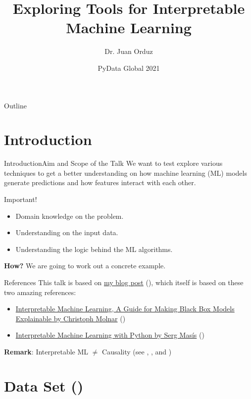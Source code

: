 \documentclass[10pt]{beamer}
\title[Exploring Tools for Interpretable Machine Learning] %
{Exploring Tools for Interpretable Machine Learning}
\author[Dr. Juan Orduz] %
{Dr. Juan Orduz}
\institute[Mathematician \& Data Scientist] %
{}
\date[PyData Global 2021] %
{PyData Global 2021}
\begin{document}
\begin{frame}
  \titlepage
\end{frame}

\begin{frame}{Outline}
\tableofcontents
\end{frame}

\section{Introduction}

\begin{frame}{Introduction}{Aim and Scope of the Talk}
We want to test explore various techniques to get a better understanding on how machine learning (ML) models generate predictions and how features interact with each other.

\begin{block}{Important!}
\begin{itemize}
\item Domain knowledge on the problem. 
\item Understanding on the input data.
\item Understanding the logic behind the ML algorithms.
\end{itemize}
\end{block}
\pause
{\bf How?} We are going to work out a concrete example.
\begin{block}{References}
This talk is based on \href{https://juanitorduz.github.io/interpretable_ml/}{my blog post} (\cite{interpretable_ml_orduz_2021}), which itself is based on these two amazing references:
\begin{itemize}
\item \href{https://christophm.github.io/interpretable-ml-book/}{Interpretable Machine Learning, A Guide for Making Black Box Models Explainable by Christoph Molnar} (\cite{molnar2019})
\item \href{https://github.com/PacktPublishing/Interpretable-Machine-Learning-with-Python}{Interpretable Machine Learning with Python by Serg Mas\'is} (\cite{masis2021})
\end{itemize}
\end{block}
{\bf Remark}: Interpretable ML $\neq$ Causality (see \cite{10.2307/j.ctv1c29t27}, \cite{tdd_sl}, \cite{statrethinkingbook} and \cite{molnar2020interpretable})
\end{frame}

\section{Data Set (\cite{molnar2019})}
\end{document}
